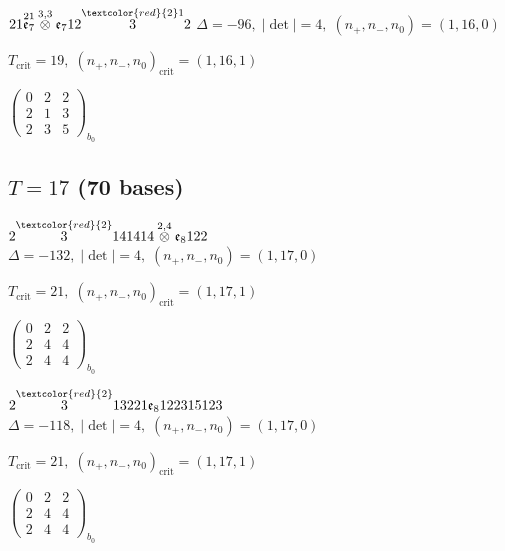 \documentclass[10pt]{article}
\begin{document}
$21\overset{21}{\mathfrak{e}_7}\overset{3,3}{\otimes}\mathfrak{e}_712\overset{\textcolor{red}{2}1}{3}2$ \quad $\Delta=-96,\; |\det|=4,\; (n_+,n_-,n_0)=(1,16,0)$

\hspace{1em}$T_{\text{crit}}=19,\; (n_+,n_-,n_0)_{\text{crit}}=(1,16,1)$

\hspace{2em}$\left(\begin{smallmatrix}0 & 2 & 2 \\ 2 & 1 & 3 \\ 2 & 3 & 5\end{smallmatrix}\right)_{\!b_0}$


\subsection*{$T = 17$ \quad (70 bases)}
\smallskip

$2\overset{\textcolor{red}{2}}{3}141414\overset{2,4}{\otimes}\mathfrak{e}_8122$ \quad $\Delta=-132,\; |\det|=4,\; (n_+,n_-,n_0)=(1,17,0)$

\hspace{1em}$T_{\text{crit}}=21,\; (n_+,n_-,n_0)_{\text{crit}}=(1,17,1)$

\hspace{2em}$\left(\begin{smallmatrix}0 & 2 & 2 \\ 2 & 4 & 4 \\ 2 & 4 & 4\end{smallmatrix}\right)_{\!b_0}$

\smallskip

$2\overset{\textcolor{red}{2}}{3}13221\mathfrak{e}_8122315123$ \quad $\Delta=-118,\; |\det|=4,\; (n_+,n_-,n_0)=(1,17,0)$

\hspace{1em}$T_{\text{crit}}=21,\; (n_+,n_-,n_0)_{\text{crit}}=(1,17,1)$

\hspace{2em}$\left(\begin{smallmatrix}0 & 2 & 2 \\ 2 & 4 & 4 \\ 2 & 4 & 4\end{smallmatrix}\right)_{\!b_0}$

\smallskip
\end{document}
